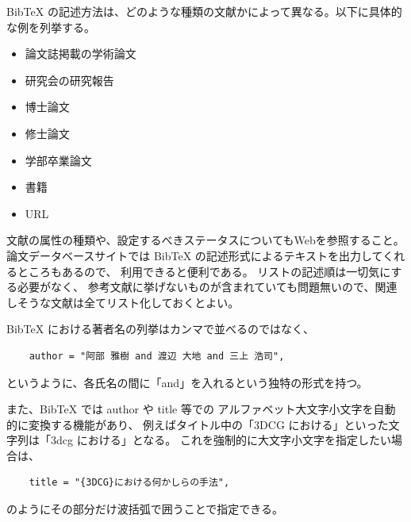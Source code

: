 BibTeX の記述方法は、どのような種類の文献かによって異なる。以下に具体的な例を列挙する。
\begin{itemize}
 \item 論文誌掲載の学術論文\cite{abeJ}\cite{nowrouzezahrai}
 \item 研究会の研究報告\cite{aoki}
 \item 博士論文\cite{takeuchi}
 \item 修士論文\cite{abeM}
 \item 学部卒業論文\cite{abeU}
 \item 書籍\cite{dragonball}
 \item URL\cite{fk}
\end{itemize}

文献の属性の種類や、設定するべきステータスについてもWebを参照すること。
論文データベースサイトでは BibTeX の記述形式によるテキストを出力してくれるところもあるので、
利用できると便利である。
リストの記述順は一切気にする必要がなく、
参考文献に挙げないものが含まれていても問題無いので、関連しそうな文献は全てリスト化しておくとよい。

BibTeX における著者名の列挙はカンマで並べるのではなく、
\begin{verbatim}
    author = "阿部 雅樹 and 渡辺 大地 and 三上 浩司",
\end{verbatim}
というように、各氏名の間に「and」を入れるという独特の形式を持つ。

また、BibTeX では author や title 等での
アルファベット大文字小文字を自動的に変換する機能があり、
例えばタイトル中の「3DCG における」といった文字列は「3dcg における」となる。
これを強制的に大文字小文字を指定したい場合は、
\begin{verbatim}
    title = "{3DCG}における何かしらの手法",
\end{verbatim}
のようにその部分だけ波括弧で囲うことで指定できる。

